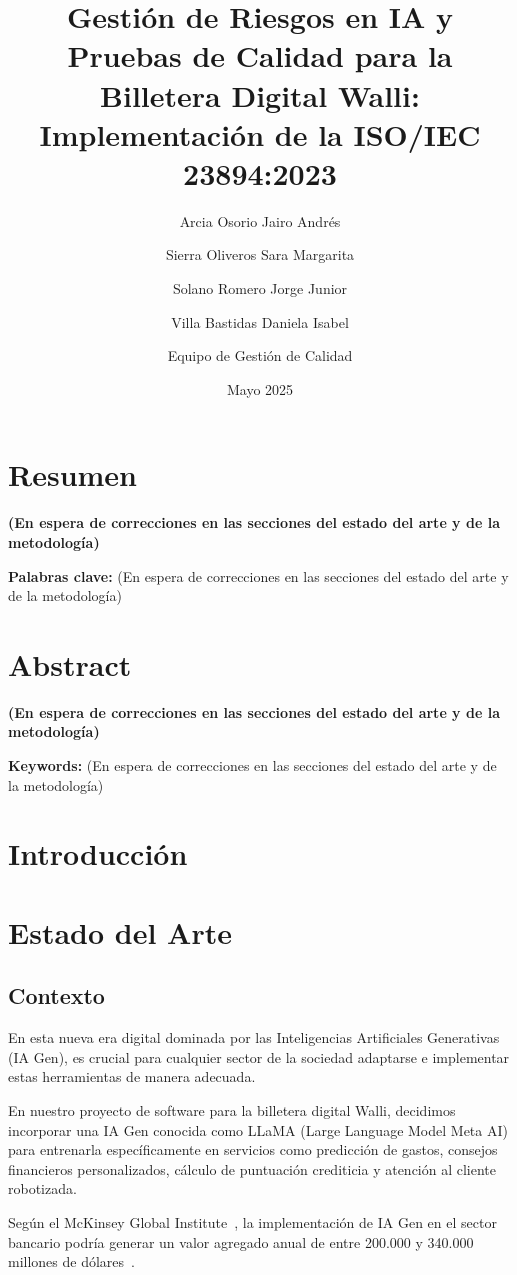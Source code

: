 \documentclass[12pt]{article}
\title{\textbf{Gestión de Riesgos en IA y Pruebas de Calidad para la Billetera Digital Walli: Implementación de la ISO/IEC 23894:2023}}
\author{Arcia Osorio Jairo Andrés \and Sierra Oliveros Sara Margarita \and Solano Romero Jorge Junior \and Villa Bastidas Daniela Isabel \and Equipo de Gestión de Calidad}
\date{Mayo 2025}
\begin{document}
\maketitle

\tableofcontents
\newpage

\section{Resumen}
\textbf{(En espera de correcciones en las secciones del estado del arte y de la metodología)}

\textbf{Palabras clave:} (En espera de correcciones en las secciones del estado del arte y de la metodología)

\section{Abstract}
\textbf{(En espera de correcciones en las secciones del estado del arte y de la metodología)}

\textbf{Keywords:} (En espera de correcciones en las secciones del estado del arte y de la metodología)

\section{Introducción}
\label{sec:introduccion}

\section{Estado del Arte}
\label{sec:estado_arte}

\subsection{Contexto}
En esta nueva era digital dominada por las Inteligencias Artificiales Generativas (IA Gen), es crucial para cualquier sector de la sociedad adaptarse e implementar estas herramientas de manera adecuada. 

En nuestro proyecto de software para la billetera digital Walli, decidimos incorporar una IA Gen conocida como LLaMA (Large Language Model Meta AI) para entrenarla específicamente en servicios como predicción de gastos, consejos financieros personalizados, cálculo de puntuación crediticia y atención al cliente robotizada. 

Según el McKinsey Global Institute~\cite{mckinsey}, la implementación de IA Gen en el sector bancario podría generar un valor agregado anual de entre 200.000 y 340.000 millones de dólares~\cite{sheth2022}. 
\end{document}
